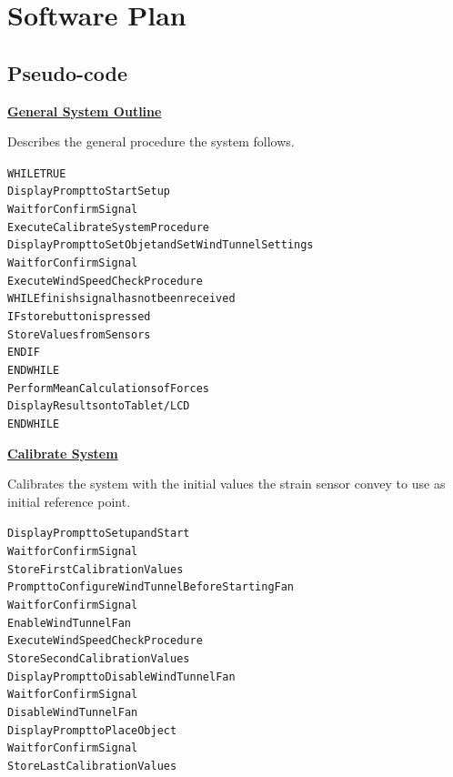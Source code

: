 \section{Software Plan}
	
	\subsection{Pseudo-code}
		\underline{\textbf{General System Outline}} 

		Describes the general procedure the system follows.
		
		\begin{framed}
		\begin{alltt} 
			        \color{fushia}WHILE TRUE\color{black}
			            Display Prompt to Start Setup
			            Wait for Confirm Signal
			            Execute Calibrate System Procedure
			            Display Prompt to Set Objet and Set Wind Tunnel Settings
			            Wait for Confirm Signal
			            Execute Wind Speed Check Procedure
			            \color{fushia}WHILE \color{black}finish signal has not been received
			                \color{fushia}IF\color{black} store button is pressed
			                    Store Values from Sensors
			                \color{fushia}ENDIF\color{black}
			            \color{fushia}ENDWHILE\color{black}
			            Perform Mean Calculations of Forces
			            Display Results onto Tablet/LCD
			        \color{fushia}ENDWHILE\color{black}
		\end{alltt}
		\end{framed}

		\underline{\textbf{Calibrate System}}

		Calibrates the system with the initial values the strain sensor convey to use as initial reference point.
		\begin{framed}
		\begin{alltt}	 
			        Display Prompt to Setup and Start
			        Wait for Confirm Signal
			        Store First Calibration Values
			        Prompt to Configure Wind Tunnel Before Starting Fan
			        Wait for Confirm Signal
			        Enable Wind Tunnel Fan
			        Execute Wind Speed Check Procedure
			        Store Second Calibration Values
			        Display Prompt to Disable Wind Tunnel Fan
			        Wait for Confirm Signal
			        Disable Wind Tunnel Fan
			        Display Prompt to Place Object
			        Wait for Confirm Signal
			        Store Last Calibration Values
		\end{alltt}
		\end{framed}

